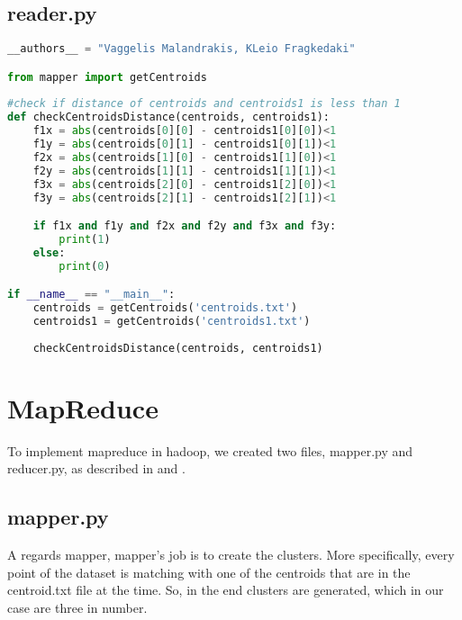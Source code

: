 \subsection{reader.py}
\begin{lstlisting}[language=Python]
__authors__ = "Vaggelis Malandrakis, KLeio Fragkedaki"

from mapper import getCentroids
	
#check if distance of centroids and centroids1 is less than 1
def checkCentroidsDistance(centroids, centroids1):
	f1x = abs(centroids[0][0] - centroids1[0][0])<1
	f1y = abs(centroids[0][1] - centroids1[0][1])<1
	f2x = abs(centroids[1][0] - centroids1[1][0])<1
	f2y = abs(centroids[1][1] - centroids1[1][1])<1
	f3x = abs(centroids[2][0] - centroids1[2][0])<1
	f3y = abs(centroids[2][1] - centroids1[2][1])<1

	if f1x and f1y and f2x and f2y and f3x and f3y:
		print(1)
	else:
		print(0)

if __name__ == "__main__":
	centroids = getCentroids('centroids.txt')
	centroids1 = getCentroids('centroids1.txt')
	
	checkCentroidsDistance(centroids, centroids1)

\end{lstlisting}

\section{MapReduce}
To implement mapreduce in hadoop, we created two files, mapper.py and reducer.py, as described in \cite{MapReducePythonPaper1} and \cite{MapReducePythonPaper2}.

\subsection{mapper.py}
 A regards mapper, mapper's job is to create the clusters. More specifically, every point of the dataset is matching with one of the centroids that are in the centroid.txt file at the time. So, in the end clusters are generated, which in our case are three in number.
 
 \HRule \\[0.2cm] %
 
